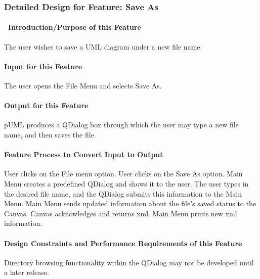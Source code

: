 \documentclass[twoside,letterpaper]{article}
\begin{document}
{\clearpage

  


\subsubsection{Detailed Design for Feature: Save As }

\paragraph[\ Introduction/Purpose of this Feature]
{\ Introduction/Purpose of this Feature}
{\color{black}
The user wishes to save a UML diagram under a new file name.
}

\paragraph[Input for this Feature]{Input for this Feature}
{\color{black}
The user opens the File Menu and selects Save As.
}

\paragraph{Output for this Feature}
{\color{black}
pUML produces a QDialog box through which the user may type a new file name, and then saves the file.
}

\paragraph{Feature Process to Convert Input to Output}
{\color{black}
User clicks on the File menu option. User clicks on the Save As option. Main Menu creates a predefined QDialog and shows it to the user. The user types in the desired file name, and the QDialog submits this information to the Main Menu. Main Menu sends updated information about the file{\textquoteright}s saved status to the Canvas. Canvas acknowledges and returns xml.  Main Menu prints new xml information.
}

\paragraph{Design Constraints and Performance Requirements of this Feature}
{\color{black}
Directory browsing functionality within the QDialog may not be developed until a later release.
}
\bigskip
\bigskip

}
\end{document}
